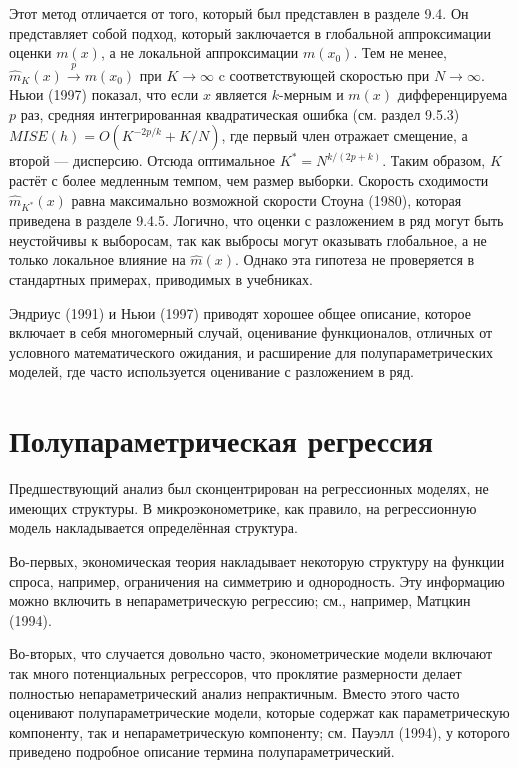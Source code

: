 Этот метод отличается от того, который был представлен в разделе 9.4. Он представляет собой подход, который заключается в глобальной аппроксимации оценки $m(x)$, а не локальной аппроксимации $m(x_0)$. Тем не менее, $\hat{m}_K(x) \stackrel{p}{\rightarrow} m(x_0)$ при $K \rightarrow \infty$ c соответствующей скоростью при $N \rightarrow \infty$. Ньюи (1997) показал, что если $x$ является $k$-мерным и $m(x)$ дифференцируема $p$ раз, средняя интегрированная квадратическая ошибка (см. раздел 9.5.3) $MISE(h) = O(K^{-2p/k} + K/N)$, где первый член отражает смещение, а второй --- дисперсию. Отсюда оптимальное $K^* = N^{k/(2p+k)}$. Таким образом, $K$ растёт с более медленным темпом, чем размер выборки. Скорость сходимости $\hat{m}_{K^*}(x)$ равна максимально возможной скорости Стоуна (1980), которая приведена в разделе 9.4.5. Логично, что оценки с разложением в ряд могут быть неустойчивы к выборосам, так как выбросы могут оказывать глобальное, а не только локальное влияние на $\hat{m}(x)$. Однако эта гипотеза не проверяется  в стандартных примерах, приводимых в учебниках.

Эндриус (1991) и Ньюи (1997) приводят хорошее общее описание, которое включает в себя многомерный случай, оценивание функционалов, отличных от условного математического ожидания, и расширение для полупараметрических моделей, где часто используется оценивание с разложением в ряд.

\section{Полупараметрическая регрессия}

Предшествующий анализ был сконцентрирован на регрессионных моделях, не имеющих структуры. В микроэконометрике, как правило, на регрессионную модель накладывается определённая структура.

Во-первых, экономическая теория накладывает некоторую структуру на функции спроса, например, ограничения на симметрию и однородность. Эту информацию можно включить в непараметрическую регрессию; см., например, Матцкин (1994).

Во-вторых, что случается довольно часто, эконометрические модели включают так много потенциальных регрессоров, что проклятие размерности делает полностью непараметрический анализ непрактичным. Вместо этого часто оценивают полупараметрические модели, которые содержат как параметрическую компоненту, так и непараметрическую компоненту; см. Пауэлл (1994), у которого приведено подробное описание термина полупараметрический.

